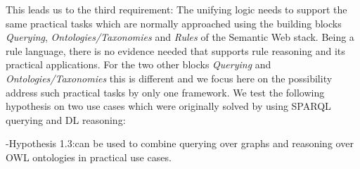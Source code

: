 This leads us to the third requirement: The unifying logic needs to support the same practical tasks which are normally approached using
the building blocks \emph{Querying}, \emph{Ontologies/Taxonomies} and \emph{Rules} of the Semantic Web stack.
Being a rule language, there is no evidence needed that \nthree supports rule reasoning and its practical applications. 
For the two other blocks 
\emph{Querying} and \emph{Ontologies/Taxonomies} this is different and we focus here on the possibility address such practical tasks by only one framework. 
We test the following hypothesis on two use cases which were originally solved by using SPARQL querying and \owl DL reasoning:
%

\hyp{Hypothesis 1.3:}{\nthreelogic can be used to combine querying over \rdf graphs and reasoning over OWL ontologies in practical use cases.}

